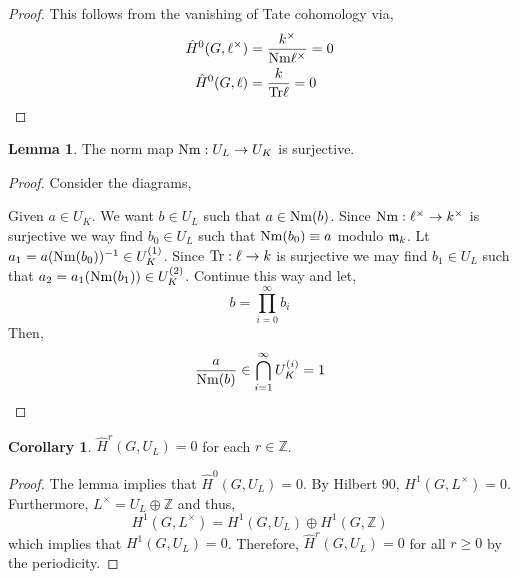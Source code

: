 \documentclass[12pt]{extarticle}
\newcommand{\Z}{\mathbb{Z}}
\theoremstyle{definition}
\newtheorem{lemma}[theorem]{Lemma}
\newtheorem{corollary}[theorem]{Corollary}
\begin{document}
\begin{proof}
This follows from the vanishing of Tate cohomology via,
\begin{align*}
\hat{H}^0(G, \ell^\times) & = \frac{k^\times}{\mathrm{Nm}{\ell^\times}} = 0 
\\
\hat{H}^0(G, \ell) & = \frac{k}{\mathrm{Tr}{\ell}} = 0 
\end{align*}
\end{proof}

\begin{lemma}
The norm map $\mathrm{Nm} : U_L \to U_K$ is surjective. 
\end{lemma}

\begin{proof}
Consider the diagrams,
\begin{center}
\end{center}

\begin{center}
\end{center}
Given $a \in U_K$. We want $b \in U_L$ such that $a \in \mathrm{Nm}(b)$. Since $\mathrm{Nm} : \ell^\times \to k^\times$ is surjective we way find $b_0 \in U_L$ such that $\mathrm{Nm}(b_0) \equiv a$ modulo $\mathfrak{m}_k$. Lt $a_1 = a (\mathrm{Nm}(b_0))^{-1} \in U_K^{(1)}$. Since $\mathrm{Tr} : \ell \to k$ is surjective we may find $b_1 \in U_L$ such that $a_2 = a_1 (\mathrm{Nm}(b_1)) \in U_K^{(2)}$. Continue this way and let,
\[ b = \prod_{ i = 0}^\infty b_i \]
Then,
\[ \frac{a}{\mathrm{Nm}(b)} \in \bigcap_{i = 1}^\infty U_K^{(i)} = 1 \]
\end{proof}

\begin{corollary}
$\hat{H}^r(G, U_L) = 0$ for each $r \in \Z$. 
\end{corollary}

\begin{proof}
The lemma implies that $\hat{H}^0(G, U_L) = 0$. By Hilbert 90, $H^1(G, L^\times) = 0$. Furthermore, $L^\times = U_L \oplus \Z$ and thus,
\[ H^1(G, L^\times) = H^1(G, U_L) \oplus H^1(G, \Z) \]
which implies that $H^1(G, U_L) = 0$. Therefore, $\hat{H}^r(G, U_L) = 0$ for all $r \ge 0$ by the periodicity. 
\end{proof}
\end{document}
